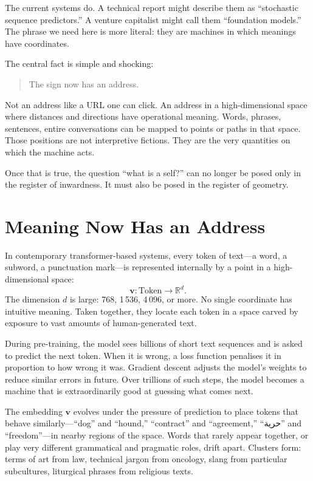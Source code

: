 The current systems do. A technical report might describe them as ``stochastic sequence predictors.'' A venture capitalist might call them ``foundation models.'' The phrase we need here is more literal: they are machines in which meanings have coordinates.

The central fact is simple and shocking:

\begin{quote}
The sign now has an address.
\end{quote}

Not an address like a URL one can click. An address in a high-dimensional space where distances and directions have operational meaning. Words, phrases, sentences, entire conversations can be mapped to points or paths in that space. Those positions are not interpretive fictions. They are the very quantities on which the machine acts.

Once that is true, the question ``what is a self?'' can no longer be posed only in the register of inwardness. It must also be posed in the register of geometry.

\section{Meaning Now Has an Address}

In contemporary transformer-based systems, every token of text---a word, a subword, a punctuation mark---is represented internally by a point in a high-dimensional space:
\[
\mathbf{v} : \text{Token} \rightarrow \mathbb{R}^{d}.
\]
The dimension $d$ is large: 768, 1\,536, 4\,096, or more. No single coordinate has intuitive meaning. Taken together, they locate each token in a space carved by exposure to vast amounts of human-generated text.

During pre-training, the model sees billions of short text sequences and is asked to predict the next token. When it is wrong, a loss function penalises it in proportion to how wrong it was. Gradient descent adjusts the model's weights to reduce similar errors in future. Over trillions of such steps, the model becomes a machine that is extraordinarily good at guessing what comes next.

The embedding $\mathbf{v}$ evolves under the pressure of prediction to place tokens that behave similarly---``dog'' and ``hound,'' ``contract'' and ``agreement,'' ``\textarabic{حرية}'' and ``freedom''---in nearby regions of the space. Words that rarely appear together, or play very different grammatical and pragmatic roles, drift apart. Clusters form: terms of art from law, technical jargon from oncology, slang from particular subcultures, liturgical phrases from religious texts.

